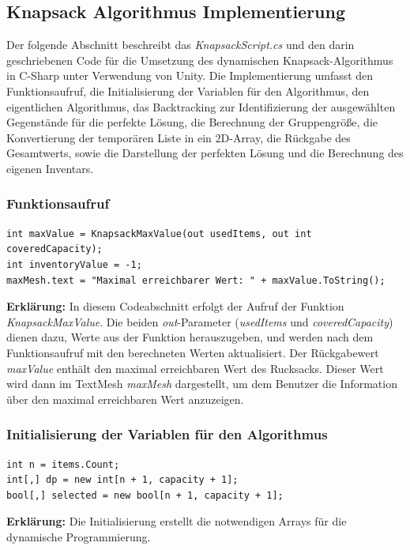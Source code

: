 \subsection{Knapsack Algorithmus Implementierung}
Der folgende Abschnitt beschreibt das \textit{KnapsackScript.cs} und den darin geschriebenen Code für die Umsetzung des
dynamischen Knapsack-Algorithmus in C-Sharp unter Verwendung von Unity. Die Implementierung umfasst den Funktionsaufruf, die
Initialisierung der Variablen für den Algorithmus, den eigentlichen Algorithmus, das Backtracking zur
Identifizierung der ausgewählten Gegenstände für die perfekte Lösung, die Berechnung der Gruppengröße, die Konvertierung
der temporären Liste in ein 2D-Array, die Rückgabe des Gesamtwerts, sowie die Darstellung der perfekten Lösung und die
Berechnung des eigenen Inventars.

\subsubsection{Funktionsaufruf}
\begin{lstlisting}[style=csharp, caption={}, label=code:init]
int maxValue = KnapsackMaxValue(out usedItems, out int coveredCapacity);
int inventoryValue = -1;
maxMesh.text = "Maximal erreichbarer Wert: " + maxValue.ToString();
\end{lstlisting}
\textbf{Erklärung:} In diesem Codeabschnitt erfolgt der Aufruf der Funktion \textit{KnapsackMaxValue}. Die beiden
\textit{out}-Parameter (\textit{usedItems} und \textit{coveredCapacity}) dienen dazu, Werte aus der Funktion
herauszugeben, und werden nach dem Funktionsaufruf mit den berechneten Werten aktualisiert. Der Rückgabewert
\textit{maxValue} enthält den maximal erreichbaren Wert des Rucksacks. Dieser Wert wird dann im TextMesh \textit{maxMesh}
dargestellt, um dem Benutzer die Information über den maximal erreichbaren Wert anzuzeigen.

\subsubsection{Initialisierung der Variablen für den Algorithmus}
\begin{lstlisting}[style=csharp, caption={}, label=code:variable]
int n = items.Count;
int[,] dp = new int[n + 1, capacity + 1];
bool[,] selected = new bool[n + 1, capacity + 1];
\end{lstlisting}
\textbf{Erklärung:} Die Initialisierung erstellt die notwendigen Arrays für die dynamische Programmierung.\\

